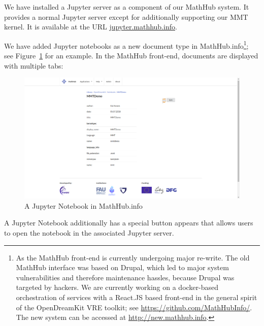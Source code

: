 We have installed a Jupyter server as a component of our MathHub system.
It provides a normal Jupyter server except for additionally supporting our MMT kernel.
It is available at the URL \url{jupyter.mathhub.info}.

We have added Jupyter notebooks as a new document type in MathHub.info\footnote{As the MathHub front-end is currently undergoing major re-write.
  The old MathHub interface was based on Drupal, which led to major system vulnerabilities and therefore maintenance hassles, because Drupal was targeted by hackers.
  We are currently working on a docker-based orchestration of services with a React.JS based front-end in the general spirit of the OpenDreamKit VRE toolkit; see \url{https://github.com/MathHubInfo/}. The new system can be accessed at \url{http://new.mathhub.info}.}; see Figure~\ref{fig:mathhub-NB} for an example. In the MathHub front-end, documents are displayed with multiple tabs: 

\begin{figure}[ht]\centering
  \includegraphics[width=15cm]{FrontendScreenshot}
  \caption{A Jupyter Notebook in MathHub.info}\label{fig:mathhub-NB}
\end{figure}

A Jupyter Notebook additionally has a special button appears that allows users to open the notebook in the associated Jupyter server.





